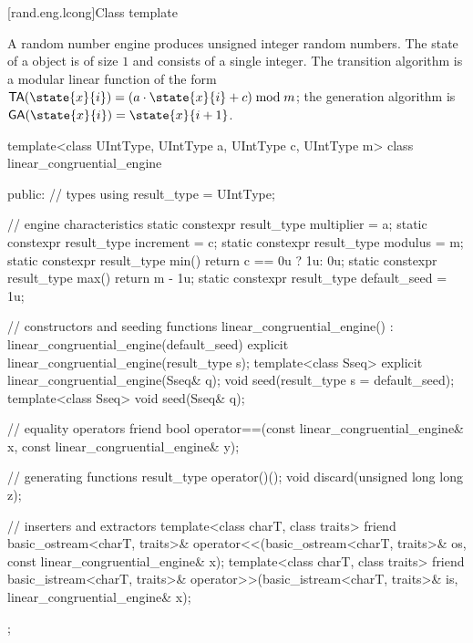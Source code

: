 
[rand.eng.lcong]{Class template }%
%

\pnum
A  random number engine
produces unsigned integer random numbers.
The state 
of a  object 
is of size $1$
and consists of a single integer.
The transition algorithm
is a modular linear function of the form
$\mathsf{TA}(\state{x}{i}) = (a \cdot \state{x}{i} + c) \bmod m$;
the generation algorithm
is $\mathsf{GA}(\state{x}{i}) = \state{x}{i+1}$.

%
%
\begin{codeblock}
template<class UIntType, UIntType a, UIntType c, UIntType m>
  class linear_congruential_engine {
  public:
    // types
    using result_type = UIntType;

    // engine characteristics
    static constexpr result_type multiplier = a;
    static constexpr result_type increment = c;
    static constexpr result_type modulus = m;
    static constexpr result_type min() { return c == 0u ? 1u: 0u; }
    static constexpr result_type max() { return m - 1u; }
    static constexpr result_type default_seed = 1u;

    // constructors and seeding functions
    linear_congruential_engine() : linear_congruential_engine(default_seed) {}
    explicit linear_congruential_engine(result_type s);
    template<class Sseq> explicit linear_congruential_engine(Sseq& q);
    void seed(result_type s = default_seed);
    template<class Sseq> void seed(Sseq& q);

    // equality operators
    friend bool operator==(const linear_congruential_engine& x,
                           const linear_congruential_engine& y);

    // generating functions
    result_type operator()();
    void discard(unsigned long long z);

    // inserters and extractors
    template<class charT, class traits>
      friend basic_ostream<charT, traits>&
        operator<<(basic_ostream<charT, traits>& os, const linear_congruential_engine& x);
    template<class charT, class traits>
      friend basic_istream<charT, traits>&
        operator>>(basic_istream<charT, traits>& is, linear_congruential_engine& x);
  };
\end{codeblock}

